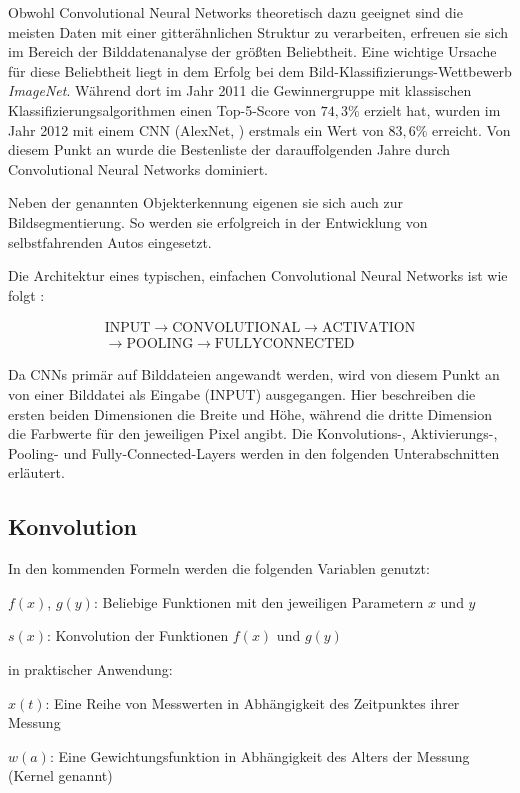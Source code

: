 Obwohl Convolutional Neural Networks theoretisch dazu geeignet sind die meisten Daten mit einer gitterähnlichen Struktur zu verarbeiten, erfreuen sie sich im Bereich der Bilddatenanalyse der größten Beliebtheit. \cite[Kap.~9]{deeplearning_16} Eine wichtige Ursache für diese Beliebtheit liegt \bspw in dem Erfolg bei dem Bild-Klassifizierungs-Wettbewerb \textit{ImageNet}. Während dort im Jahr 2011 die Gewinnergruppe mit klassischen Klassifizierungsalgorithmen einen Top-5-Score von $74,3\%$ erzielt hat, wurden im Jahr 2012 mit einem CNN (AlexNet, \cite{alexnet}) erstmals ein Wert von $83,6\%$ erreicht. Von diesem Punkt an wurde die Bestenliste der darauffolgenden Jahre durch Convolutional Neural Networks dominiert. \cite[Kap.~1]{deeplearning_18}

Neben der genannten Objekterkennung eigenen sie sich auch zur Bildsegmentierung. So werden sie \bspw erfolgreich in der Entwicklung von selbstfahrenden Autos eingesetzt. \cite{kaymak_19}

Die Architektur eines typischen, einfachen Convolutional Neural Networks ist wie folgt \cite{cs231n}:

\begin{multline*}
\mathrm{INPUT}\rightarrow\mathrm{CONVOLUTIONAL}\rightarrow\mathrm{ACTIVATION}\\\rightarrow\mathrm{POOLING}\rightarrow\mathrm{FULLYCONNECTED}
\end{multline*}

Da CNNs primär auf Bilddateien angewandt werden, wird von diesem Punkt an von einer Bilddatei als Eingabe ($\mathrm{INPUT}$) ausgegangen. Hier beschreiben die ersten beiden Dimensionen die Breite und Höhe, während die dritte Dimension die Farbwerte für den jeweiligen Pixel angibt. Die Konvolutions-, Aktivierungs-, Pooling- und Fully-Connected-Layers werden in den folgenden Unterabschnitten erläutert.

\subsection{Konvolution}
\label{ssec:conv}

\noindent In den kommenden Formeln werden die folgenden Variablen genutzt:
\begin{description}
\item  $f(x)$, $g(y)$: Beliebige Funktionen mit den jeweiligen Parametern $x$ und $y$
\item  $s(x)$: Konvolution der Funktionen $f(x)$ und $g(y)$\\
\end{description}
\noindent \Bzw in praktischer Anwendung:
\begin{description}
\item  $x(t)$: Eine Reihe von Messwerten in Abhängigkeit des Zeitpunktes ihrer Messung
\item  $w(a)$: Eine Gewichtungsfunktion in Abhängigkeit des Alters der Messung (\iA Kernel genannt)
\end{description}


